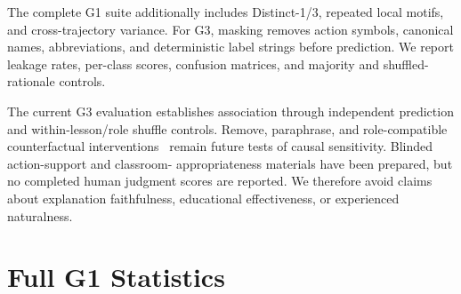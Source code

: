 \documentclass[manuscript,review,anonymous]{acmart}
\begin{document}
The complete G1 suite additionally includes Distinct-1/3, repeated local
motifs, and cross-trajectory variance. For G3, masking removes action symbols,
canonical names, abbreviations, and deterministic label strings before
prediction. We report leakage rates, per-class scores, confusion matrices, and
majority and shuffled-rationale controls.

The current G3 evaluation establishes association through independent
prediction and within-lesson/role shuffle controls. Remove, paraphrase, and
role-compatible counterfactual interventions~\citep{deyoung2020eraser} remain
future tests of causal sensitivity. Blinded action-support and classroom-
appropriateness materials have been prepared, but no completed human judgment
scores are reported. We therefore avoid claims about explanation faithfulness,
educational effectiveness, or experienced naturalness.

\section{Full G1 Statistics}
\end{document}
